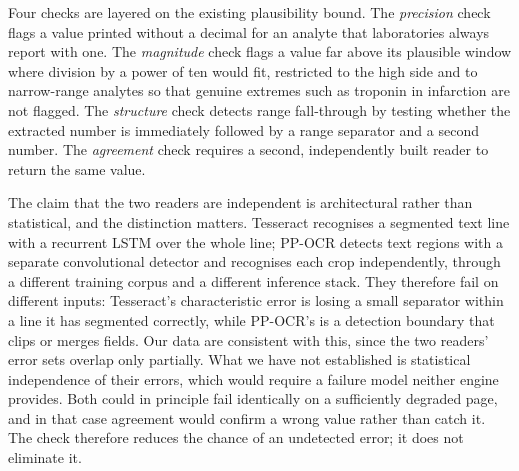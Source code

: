\documentclass[11pt]{article}
\begin{document}
Four checks are layered on the existing plausibility bound. The \emph{precision} check flags a
value printed without a decimal for an analyte that laboratories always report with one. The
\emph{magnitude} check flags a value far above its plausible window where division by a power of
ten would fit, restricted to the high side and to narrow-range analytes so that genuine extremes
such as troponin in infarction are not flagged. The \emph{structure} check detects range
fall-through by testing whether the extracted number is immediately followed by a range
separator and a second number. The \emph{agreement} check requires a second, independently built
reader to return the same value.

The claim that the two readers are independent is architectural rather than statistical, and
the distinction matters. Tesseract recognises a segmented text line with
a recurrent LSTM over the whole line; PP-OCR detects text regions with a separate convolutional
detector and recognises each crop independently, through a different training corpus and a
different inference stack. They therefore fail on different inputs: Tesseract's characteristic
error is losing a small separator within a line it has segmented correctly, while PP-OCR's is a
detection boundary that clips or merges fields. Our data are consistent with this, since the two
readers' error sets overlap only partially. What we have not established is statistical
independence of their errors, which would require a failure model neither engine provides. Both
could in principle fail identically on a sufficiently degraded page, and in that case agreement
would confirm a wrong value rather than catch it. The check therefore reduces the chance of an
undetected error; it does not eliminate it.
\end{document}
